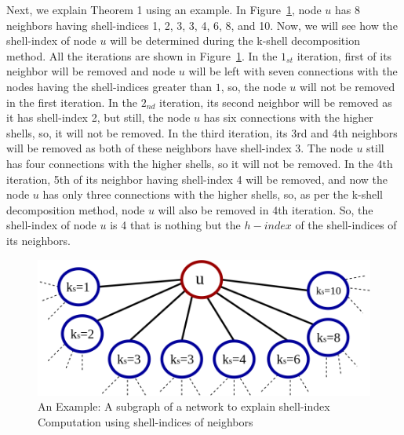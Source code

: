 \documentclass[conference]{IEEEtran}
\begin{document}
Next, we explain Theorem 1 using an example. In Figure~\ref{exa1}, node $u$ has 8 neighbors having shell-indices 1, 2, 3, 3, 4, 6, 8, and 10. Now, we will see how the shell-index of node $u$ will be determined during the k-shell decomposition method. All the iterations are shown in Figure~\ref{exa1}. In the $1_{st}$ iteration, first of its neighbor will be removed and node $u$ will be left with seven connections with the nodes having the shell-indices greater than $1$, so, the node $u$ will not be removed in the first iteration. In the $2_{nd}$ iteration, its second neighbor will be removed as it has shell-index 2, but still, the node $u$ has six connections with the higher shells, so, it will not be removed. In the third iteration, its 3rd and 4th neighbors will be removed as both of these neighbors have shell-index 3. The node $u$ still has four connections with the higher shells, so it will not be removed. In the 4th iteration, 5th of its neighbor having shell-index 4 will be removed, and now the node $u$ has only three connections with the higher shells, so, as per the k-shell decomposition method, node $u$ will also be removed in 4th iteration. So, the shell-index of node $u$ is 4 that is nothing but the $h-index$ of the shell-indices of its neighbors.

\begin{figure}[htp]
  \centering
    \includegraphics[width=.95\linewidth]{images/kshell_example1.png}
  \caption{An Example: A subgraph of a network to explain shell-index Computation using shell-indices of neighbors}
  \label{exa1}
\end{figure}

\end{document}
